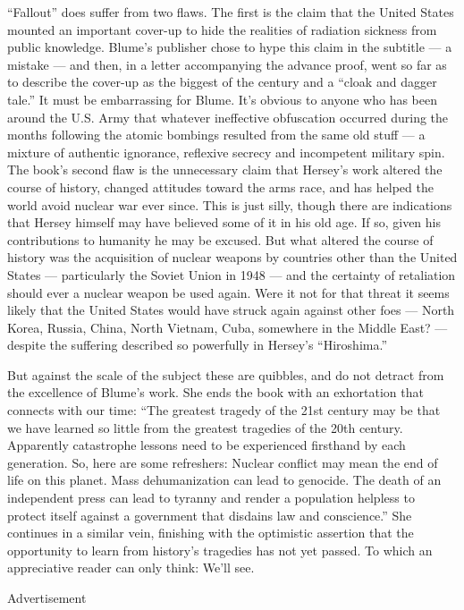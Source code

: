 ``Fallout'' does suffer from two flaws. The first is the claim that the
United States mounted an important cover-up to hide the realities of
radiation sickness from public knowledge. Blume's publisher chose to
hype this claim in the subtitle --- a mistake --- and then, in a letter
accompanying the advance proof, went so far as to describe the cover-up
as the biggest of the century and a ``cloak and dagger tale.'' It must
be embarrassing for Blume. It's obvious to anyone who has been around
the U.S. Army that whatever ineffective obfuscation occurred during the
months following the atomic bombings resulted from the same old stuff
--- a mixture of authentic ignorance, reflexive secrecy and incompetent
military spin. The book's second flaw is the unnecessary claim that
Hersey's work altered the course of history, changed attitudes toward
the arms race, and has helped the world avoid nuclear war ever since.
This is just silly, though there are indications that Hersey himself may
have believed some of it in his old age. If so, given his contributions
to humanity he may be excused. But what altered the course of history
was the acquisition of nuclear weapons by countries other than the
United States --- particularly the Soviet Union in 1948 --- and the
certainty of retaliation should ever a nuclear weapon be used again.
Were it not for that threat it seems likely that the United States would
have struck again against other foes --- North Korea, Russia, China,
North Vietnam, Cuba, somewhere in the Middle East? --- despite the
suffering described so powerfully in Hersey's ``Hiroshima.''

But against the scale of the subject these are quibbles, and do not
detract from the excellence of Blume's work. She ends the book with an
exhortation that connects with our time: ``The greatest tragedy of the
21st century may be that we have learned so little from the greatest
tragedies of the 20th century. Apparently catastrophe lessons need to be
experienced firsthand by each generation. So, here are some refreshers:
Nuclear conflict may mean the end of life on this planet. Mass
dehumanization can lead to genocide. The death of an independent press
can lead to tyranny and render a population helpless to protect itself
against a government that disdains law and conscience.'' She continues
in a similar vein, finishing with the optimistic assertion that the
opportunity to learn from history's tragedies has not yet passed. To
which an appreciative reader can only think: We'll see.

Advertisement

